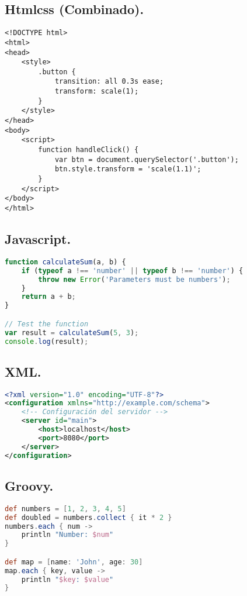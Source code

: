 \subsection{Htmlcss (Combinado).}

	\begin{lstlisting}[style=htmlcssjs]
<!DOCTYPE html>
<html>
<head>
	<style>
		.button {
			transition: all 0.3s ease;
			transform: scale(1);
		}
	</style>
</head>
<body>
	<script>
		function handleClick() {
			var btn = document.querySelector('.button');
			btn.style.transform = 'scale(1.1)';
		}
	</script>
</body>
</html>
	\end{lstlisting}

\subsection{Javascript.}

	\begin{lstlisting}[language=JavaScript]
function calculateSum(a, b) {
	if (typeof a !== 'number' || typeof b !== 'number') {
		throw new Error('Parameters must be numbers');
	}
	return a + b;
}

// Test the function
var result = calculateSum(5, 3);
console.log(result);
	\end{lstlisting}

\subsection{XML.}

	\begin{lstlisting}[language=XML, extendedchars=true]
<?xml version="1.0" encoding="UTF-8"?>
<configuration xmlns="http://example.com/schema">
	<!-- Configuración del servidor -->
	<server id="main">
		<host>localhost</host>
		<port>8080</port>
	</server>
</configuration>
	\end{lstlisting}

\subsection{Groovy.}

	\begin{lstlisting}[language=Groovy]
def numbers = [1, 2, 3, 4, 5]
def doubled = numbers.collect { it * 2 }
numbers.each { num ->
	println "Number: $num"
}

def map = [name: 'John', age: 30]
map.each { key, value ->
	println "$key: $value"
}
	\end{lstlisting}



